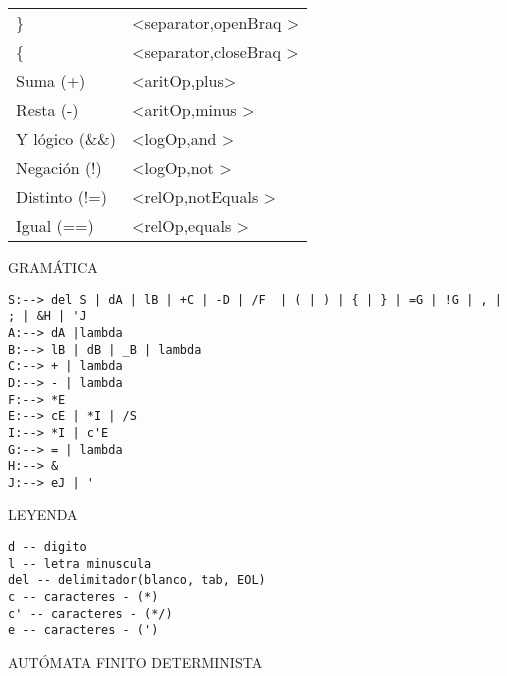 \documentclass{article}
\begin{document}
{{\begin{tabular}{l|l}
       	\}                  &\textless  separator,openBraq \textgreater\\
        \{\                  &\textless separator,closeBraq \textgreater\\
        Suma (+)	        &\textless aritOp,plus\textgreater\\
        Resta (-)	        &\textless aritOp,minus \textgreater\\
        Y lógico (\&\&)	    &\textless logOp,and \textgreater\\
        Negación (!)	    &\textless logOp,not \textgreater\\
        Distinto (!=)	    &\textless relOp,notEquals \textgreater\\
        Igual (==)	        &\textless relOp,equals \textgreater
        
    \end{tabular}
  }
}

\newpage
\begin{center}
    GRAMÁTICA
\end{center}
\begin{verbatim}
S:--> del S | dA | lB | +C | -D | /F  | ( | ) | { | } | =G | !G | , | ; | &H | 'J
A:--> dA |lambda
B:--> lB | dB | _B | lambda  
C:--> + | lambda
D:--> - | lambda
F:--> *E
E:--> cE | *I | /S
I:--> *I | c'E
G:--> = | lambda
H:--> &
J:--> eJ | '
\end{verbatim}
\begin{center}
    LEYENDA
\end{center}
\begin{verbatim}
d -- digito
l -- letra minuscula
del -- delimitador(blanco, tab, EOL)
c -- caracteres - (*)
c' -- caracteres - (*/)
e -- caracteres - (')
\end{verbatim}
\newpage
\begin{center}
AUTÓMATA FINITO DETERMINISTA
\end{center}

\vspace*{1cm}
\end{document}
